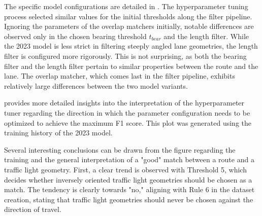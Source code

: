 \begin{table}[t]
\caption{Tuned hyperparameters for the algorithmic matching model.}
\label{tab:hyperparameter-tuning-results}
\end{table}

The specific model configurations are detailed in . The hyperparameter tuning process selected similar values for the initial thresholds along the filter pipeline. Ignoring the parameters of the overlap matchers initially, notable differences are observed only in the chosen bearing threshold $t_{bear}$ and the length filter. While the 2023 model is less strict in filtering steeply angled lane geometries, the length filter is configured more rigorously. This is not surprising, as both the bearing filter and the length filter pertain to similar properties between the route and the lane. The overlap matcher, which comes last in the filter pipeline, exhibits relatively large differences between the two model variants. 

 provides more detailed insights into the interpretation of the hyperparameter tuner regarding the direction in which the parameter configuration needs to be optimized to achieve the maximum F1 score. This plot was generated using the training history of the 2023 model.

Several interesting conclusions can be drawn from the figure regarding the training and the general interpretation of a "good" match between a route and a traffic light geometry. First, a clear trend is observed with Threshold 5, which decides whether inversely oriented traffic light geometries should be chosen as a match. The tendency is clearly towards "no," aligning with Rule 6 in the dataset creation, stating that traffic light geometries should never be chosen against the direction of travel. 

